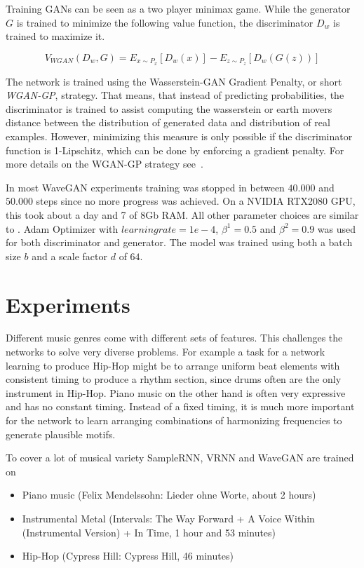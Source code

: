 \documentclass[12pt]{article}
\begin{document}
Training GANs can be seen as a two player minimax game. 
While the generator $G$ is trained to minimize the following value function, the discriminator $D_w$ is trained to maximize it.

$$
V_{WGAN}(D_w, G) = E_{x \sim P_x}[D_w(x)] - E_{z \sim P_z}[D_w(G(z))]
$$

The network is trained using the Wasserstein-GAN Gradient Penalty, or short \emph{WGAN-GP}, strategy.
That means, that instead of predicting probabilities, the discriminator is trained to assist computing the wasserstein or earth movers distance between the distribution of generated data and distribution of real examples.
However, minimizing this measure is only possible if the discriminator function is 1-Lipschitz, which can be done by enforcing a gradient penalty.
For more details on the WGAN-GP strategy see~\cite{gulrajani2017improved}.

In most WaveGAN experiments training was stopped in between $40.000$ and $50.000$ steps since no more progress was achieved.
On a NVIDIA RTX2080 GPU, this took about a day and 7 of 8Gb RAM.
All other parameter choices are similar to \cite{donahue2018adversarial}.
Adam Optimizer with $learning rate = 1e-4$, $\beta^1 = 0.5$ and $\beta^2 = 0.9$ was used for both discriminator and generator.
The model was trained using both a batch size $b$ and a scale factor $d$ of $64$.








\section{Experiments}
Different music genres come with different sets of features.
This challenges the networks to solve very diverse problems.
For example a task for a network learning to produce Hip-Hop might be to arrange uniform beat elements with consistent timing to produce a rhythm section, since drums often are the only instrument in Hip-Hop.
Piano music on the other hand is often very expressive and has no constant timing.
Instead of a fixed timing, it is much more important for the network to learn arranging combinations of harmonizing frequencies to generate plausible motifs.

To cover a lot of musical variety SampleRNN, VRNN and WaveGAN are trained on
\begin{itemize}
 \item Piano music (Felix Mendelssohn: Lieder ohne Worte, about 2 hours)
 \item Instrumental Metal (Intervals: The Way Forward + A Voice Within (Instrumental Version) + In Time, 1 hour and 53 minutes) 
 \item Hip-Hop (Cypress Hill: Cypress Hill, 46 minutes)
\end{itemize}
\end{document}
